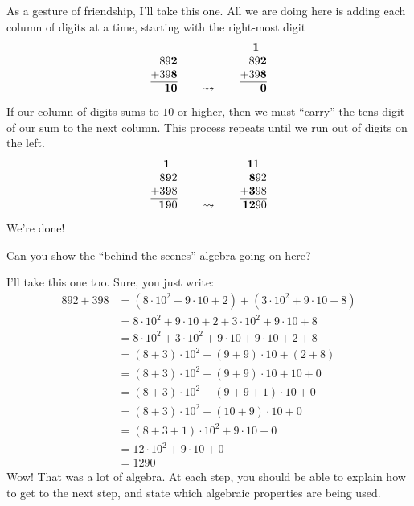 As a gesture of friendship, I'll take this one. All we are doing here
is adding each column of digits at a time, starting with the right-most
digit
\[
\begin{array}[b]{@{}r@{}}
89\textbf{2}\\
+39\textbf{8}\\ \hline
~~\textbf{10}
\end{array}
\qquad
\leadsto
\qquad
\begin{array}[b]{@{}r@{}}
\textbf{1}~~\\
89\textbf{2}\\
+39\textbf{8}\\ \hline
~~~\textbf{0}
\end{array}
\]
If our column of digits sums to $10$ or higher, then we must ``carry''
the tens-digit of our sum to the next column. This process repeats
until we run out of digits on the left.
\[
\begin{array}[b]{@{}r@{}}
\textbf{1}~~\\
8\textbf{9}2\\
+3\textbf{9}8\\ \hline
~\textbf{19}0
\end{array}
\qquad
\leadsto
\qquad
\begin{array}[b]{@{}r@{}}
\textbf{1}1~~\\
\textbf{8}92\\
+\textbf{3}98\\ \hline
\textbf{12}90
\end{array}
\]
We're done!

\begin{question}
Can you show the ``behind-the-scenes'' algebra going on here?
\end{question}

I'll take this one too. Sure, you just write:
\begin{align*}
892 + 398 &= (8\cdot 10^2 + 9\cdot 10 + 2) + (3 \cdot 10^2 + 9\cdot 10 + 8) \\
&= 8\cdot 10^2 + 9\cdot 10 + 2 + 3 \cdot 10^2 + 9\cdot 10 + 8 \\
&= 8\cdot 10^2 + 3 \cdot 10^2 + 9\cdot 10 + 9\cdot 10 + 2 + 8 \\
&= (8 + 3)\cdot 10^2 + (9 + 9)\cdot 10 + (2 + 8) \\
&= (8 + 3)\cdot 10^2 + (9 + 9)\cdot 10 + 10 + 0\\
&= (8 + 3)\cdot 10^2 + (9 + 9+1)\cdot 10 + 0 \\
&= (8 + 3)\cdot 10^2 + (10 + 9)\cdot 10 + 0 \\
&= (8 + 3+1)\cdot 10^2 + 9\cdot 10 + 0 \\
&= 12\cdot 10^2 + 9\cdot 10 + 0 \\
&= 1290
\end{align*}
Wow! That was a lot of algebra. At each step, you should be able to
explain how to get to the next step, and state which algebraic
properties are being used.


